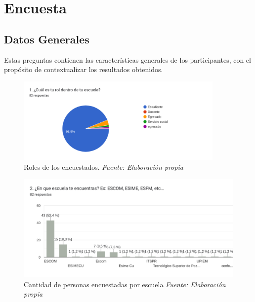 \chapter{Encuesta}\label{app1:Encuesta}

\section{Datos Generales}
Estas preguntas contienen las características generales de los participantes, con el propósito de contextualizar los resultados obtenidos.
\begin{figure}[H]
	\centering
	\includegraphics[width=0.9\textwidth]{img/appendixA/1_roles_dentro_de_escuela.png}
	\caption[Roles de los encuestados.]{Roles de los encuestados. \textit{Fuente: Elaboración propia}}
	\label{fig:app1_cantidad_encuestados}  %
\end{figure}

\begin{figure}[H]
	\centering
	\includegraphics[width=1\textwidth]{img/appendixA/2_escuelas_encuestadas.png}
	\caption[Cantidad de personas encuestadas por escuela]{Cantidad de personas encuestadas por escuela \textit{Fuente: Elaboración propia}}
	\label{fig:app1_escuelas_encuestadas}  %
\end{figure}


